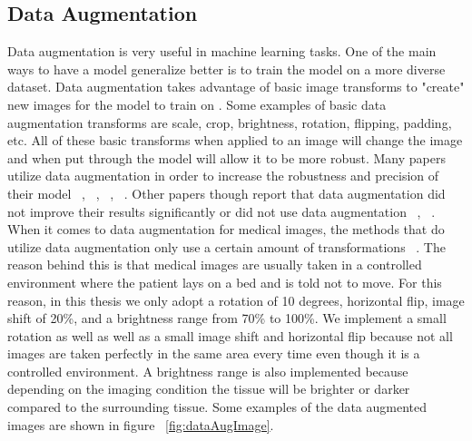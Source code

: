 \subsection{Data Augmentation}
    Data augmentation is very useful in machine learning tasks. 
    One of the main ways to have a model generalize better is to train the model on a more diverse dataset. 
    Data augmentation takes advantage of basic image transforms to "create" new images for the model to train on \cite{articledataAug}. 
    Some examples of basic data augmentation transforms are scale, crop, brightness, rotation, flipping, padding, etc. 
    All of these basic transforms when applied to an image will change the image and when put through the model will allow it to be more robust. 
    Many papers utilize data augmentation in order to increase the robustness and precision of their model ~\cite{NIPS2012_Krizhevsky}, ~\cite{articledataAug}, ~\cite{DBLP:journals/corr/MilletariNA16}, ~\cite{DBLP:journals/corr/RonnebergerFB15}.
    Other papers though report that data augmentation did not improve their results significantly or did not use data augmentation ~\cite{DBLP:journals/corr/HavaeiDWBCBPJL15}, ~\cite{DBLP:journals/corr/abs-1805-10720}. 
    When it comes to data augmentation for medical images, the methods that do utilize data augmentation only use a certain amount of transformations ~\cite{10.1007/978-3-030-01449-0_16dilatedunet}. 
    The reason behind this is that medical images are usually taken in a controlled environment where the patient lays on a bed and is told not to move. 
    For this reason, in this thesis we only adopt a rotation of 10 degrees, horizontal flip, image shift of 20\%, and a brightness range from 70\% to 100\%.
    We implement a small rotation as well as well as a small image shift and horizontal flip because not all images are taken perfectly in the same area every time even though it is a controlled environment. 
    A brightness range is also implemented because depending on the imaging condition the tissue will be brighter or darker compared to the surrounding tissue. 
    Some examples of the data augmented images are shown in figure ~\ref{fig:dataAugImage}. 
    

